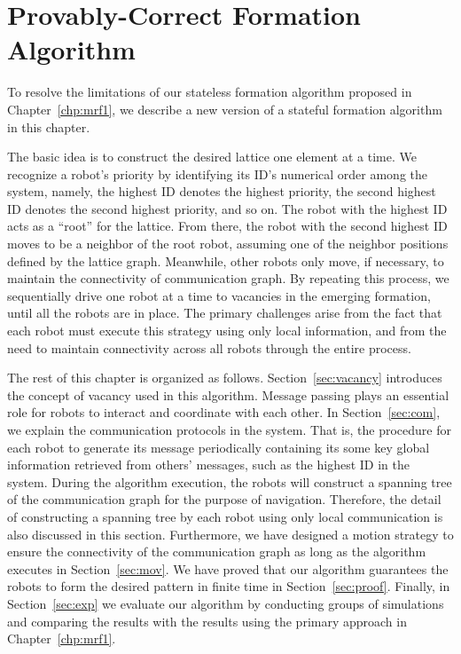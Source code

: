 \chapter{Provably-Correct Formation Algorithm}
\label{chp:mrf2}
To resolve the limitations of our stateless formation algorithm proposed in Chapter~\ref{chp:mrf1}, we describe a new version of a stateful formation algorithm in this chapter.


The basic idea is to construct the desired lattice one element at a time. 
%
We recognize a robot's priority by identifying its ID's numerical order among the system, namely, the highest ID denotes the highest priority, the second highest ID denotes the second highest priority, and so on.
%
The robot with the highest ID acts as a ``root'' for the lattice.  
%
From there, the robot with the second highest ID moves to be a neighbor of the root robot,
assuming one of the neighbor positions defined by the lattice graph.
%
Meanwhile, other robots only move, if necessary, to maintain the connectivity
of communication graph.
%
By repeating this process, we sequentially drive one robot at a time to vacancies in the emerging formation, until all the robots are in place.
%
The primary challenges arise from the fact that each robot must execute this
strategy using only local information, and from the need to maintain
connectivity across all robots through the entire process.


The rest of this chapter is organized as follows. 
%
Section~\ref{sec:vacancy} introduces the concept of vacancy used in this algorithm. 
% 
Message passing plays an essential role for robots to interact and coordinate with each other.
%
In Section~\ref{sec:com}, we explain the communication protocols in the system.
%
That is, the procedure for each robot to generate its message periodically containing its some key global information retrieved from others' messages, such as the highest ID in the system.
%
During the algorithm execution, the robots will construct a spanning tree of the communication graph for the purpose of navigation.
%
Therefore, the detail of constructing a spanning tree by each robot using only local communication is also discussed in this section.
%
Furthermore, we have designed a motion strategy to ensure the connectivity of the communication graph as long as the algorithm executes in Section~\ref{sec:mov}.
%
We have proved that our algorithm guarantees the robots to form the desired pattern in finite time in Section~\ref{sec:proof}.
%
Finally, in Section~\ref{sec:exp} we evaluate our algorithm by conducting groups of simulations and comparing the results with the results using the primary approach in Chapter~\ref{chp:mrf1}.


